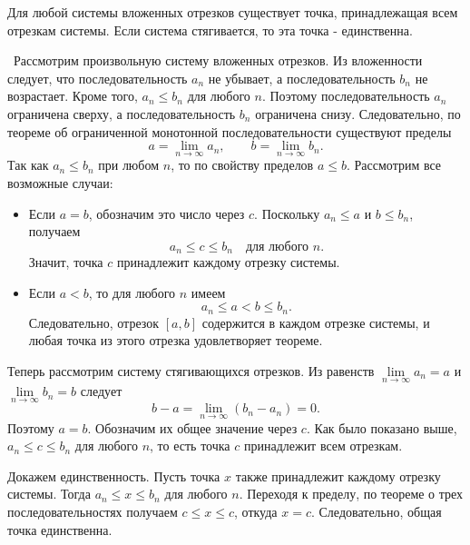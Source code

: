 \begin{theorem}
    Для любой системы вложенных отрезков существует точка, принадлежащая всем отрезкам системы. 
    Если система стягивается, то эта точка - единственна.

    \vspace{2mm}

    \proofname~Рассмотрим произвольную систему вложенных отрезков.
    Из вложенности следует, что последовательность \(a_{n}\) не убывает,
    а последовательность \(b_{n}\) не возрастает. Кроме того,
    \(a_{n}\leq b_{n}\) для любого \(n\). Поэтому последовательность
    \(a_{n}\) ограничена сверху, а последовательность \(b_{n}\) ограничена
    снизу. Следовательно, по теореме об ограниченной монотонной 
    последовательности существуют пределы
    \[a=\lim_{n\to\infty}a_{n},\qquad
    b=\lim_{n\to\infty}b_{n}.\]
    Так как \(a_{n}\leq b_{n}\) при любом \(n\), то по свойству пределов \(a\leq b\).
    Рассмотрим все возможные случаи:

    \begin{itemize}
        \item Если \(a=b\), обозначим это число через \(c\). Поскольку
        \(a_{n}\leq a\) и \(b\leq b_{n}\), получаем
        \[a_{n}\leq c\leq b_{n}\quad\text{для любого }n.\]
        Значит, точка \(c\) принадлежит каждому отрезку системы.

        \item Если \(a<b\), то для любого \(n\) имеем
        \[a_{n}\leq a<b\leq b_{n}.\]
        Следовательно, отрезок \([a,b]\) содержится в каждом отрезке
        системы, и любая точка из этого отрезка удовлетворяет теореме.
    \end{itemize}

    Теперь рассмотрим систему стягивающихся отрезков. Из равенств
    \(\underset{n\to\infty}{\lim}a_{n} = a\) и \(\underset{n\to\infty}{\lim}b_{n} = b\)
    следует \[b-a=\lim_{n\to\infty}(b_{n}-a_{n})=0.\]
    Поэтому \(a=b\). Обозначим их общее значение через \(c\). Как было
    показано выше, \(a_{n}\leq c\leq b_{n}\) для любого \(n\), то есть
    точка \(c\) принадлежит всем отрезкам.

    Докажем единственность. Пусть точка \(x\) также принадлежит каждому
    отрезку системы. Тогда \(a_{n}\leq x\leq b_{n}\) для любого \(n\).
    Переходя к пределу, по теореме о трех последовательностях
    получаем \(c\leq x\leq c\), откуда \(x=c\).
    Следовательно, общая точка единственна.~\qedsymbol
\end{theorem}
